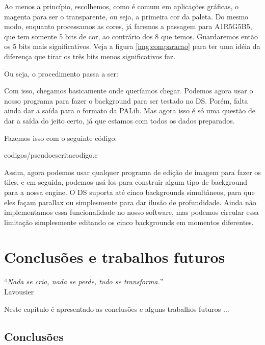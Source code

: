 \documentclass[brazil]{abnt}
\begin{document}
Ao menos a princípio, escolhemos, como é comum em aplicações gráficas, o magenta para ser o transparente, ou seja, a primeira cor da paleta. Do mesmo modo, enquanto processamos as cores, já faremos a passagem para A1R5G5B5, que tem somente 5 bits de cor, ao contrário dos 8 que temos. Guardaremos então os 5 bits mais significativos. Veja a figura \ref{img:comparacao} para ter uma idéia da diferença que tirar os três bits menos significativos faz.

Ou seja, o procedimento passa a ser:



Com isso, chegamos basicamente onde queríamos chegar. Podemos agora usar o nosso programa para fazer o background para ser testado no DS. Porém, falta ainda dar a saída para o formato da PALib. Mas agora isso é só uma questão de dar a saída do jeito certo, já que estamos com todos os dados preparados.

Fazemos isso com o seguinte código:


{codigos/pseudoescritacodigo.c}

Assim, agora podemos usar qualquer programa de edição de imagem para fazer os tiles, e em seguida, podemos usá-los para construir algum tipo de background para a nossa engine. O DS suporta até cinco backgrounds simultâneos, para que eles façam parallax ou simplesmente para dar ilusão de profundidade. Ainda não implementamos essa funcionalidade no nosso software, mas podemos circular essa limitação simplesmente editando os cinco backgrounds em momentos diferentes.

\chapter{Conclusões e trabalhos futuros\label{cap:conclusao}}

\vfill{}
\begin{flushright}{}``\emph{Nada se cria, nada se perde, tudo se
transforma.}''\\
{\small Lavousier}\end{flushright}{\small \par}
\vfill{}

Neste capítulo é apresentado as conclusões e alguns trabalhos futuros
...
\newpage


\section{Conclusões}
\end{document}

